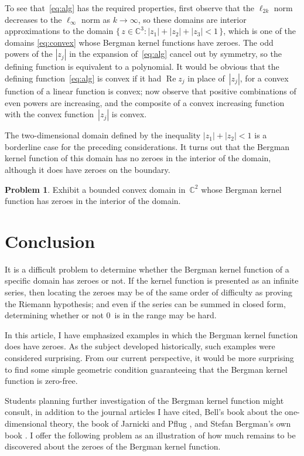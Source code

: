 \documentclass[12pt]{amsart}
\theoremstyle{definition}
\newtheorem{problem}{Problem}
\newcommand{\C}{\mathbb{C}}
\DeclareMathOperator{\re}{Re}
\begin{document}
To see that~\eqref{eq:alg} has the required properties, first
observe that the \(\ell_{2k}\) norm decreases to the
\(\ell_\infty\) norm as \(k\to\infty\), so these domains are
interior approximations to the domain \(\{\,z\in\C^3:
|z_1|+|z_2|+|z_3|<1\,\}\), which is one of the domains
\eqref{eq:convex} whose Bergman kernel functions have zeroes.
The odd powers of the \(|z_j|\) in the expansion
of~\eqref{eq:alg} cancel out by symmetry, so the defining
function is equivalent to a polynomial.  It would be obvious that
the defining function~\eqref{eq:alg} is convex if it had \(\re
z_j\) in place of~\(|z_j|\), for a convex function of a linear
function is convex; now observe that positive combinations of
even powers are increasing, and the composite of a convex
increasing function with the convex function~\(|z_j|\) is convex.

The two-dimensional domain defined by the inequality
\(|z_1|+|z_2|<1\) is a borderline case for the preceding
considerations. It turns out \cite{boasfustraube} that the
Bergman kernel function of this domain has no zeroes in the
interior of the domain, although it does have zeroes on the
boundary.

\begin{problem}
  Exhibit a bounded convex domain in~\(\C^2\) whose Bergman
  kernel function has zeroes in the interior of the domain.
\end{problem}

\section{Conclusion}
It is a difficult problem to determine whether the Bergman kernel
function of a specific domain has zeroes or not. If the kernel
function is presented as an infinite series, then locating the
zeroes may be of the same order of difficulty as proving the
Riemann hypothesis; and even if the series can be summed in
closed form, determining whether or not \(0\)~is in the range may
be hard.

In this article, I have emphasized examples in which the Bergman
kernel function does have zeroes. As the subject developed
historically, such examples were considered surprising. From our
current perspective, it would be more surprising to find some
simple geometric condition guaranteeing that the Bergman kernel
function is zero-free.

Students planning further investigation of the Bergman kernel
function might consult, in addition to the journal articles I
have cited, Bell's book \cite{bellbook} about the one-dimensional
theory, the book of Jarnicki and Pflug \cite{jarnickipflug}, and
Stefan Bergman's own book \cite{bergman}.  I offer the following
problem as an illustration of how much remains to be discovered
about the zeroes of the Bergman kernel function.
\end{document}
